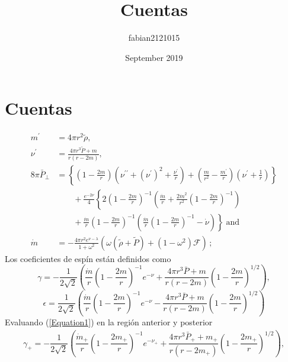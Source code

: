\documentclass{article}
\title{Cuentas}
\author{fabian2121015 }
\date{September 2019}
\begin{document}
\maketitle

\section{Cuentas}
\begin{align}
m^{\prime } &= 4 \pi r^{2}\tilde{\rho}, \label{EinsEq300}  \\
\nu^{\prime} & = \frac{4\pi r^{3}\tilde{P}+ m}{r(r-2m)}, \label{EinsEq311} \\
8\pi \bar{P}_{\perp} &= \left\{ \left( 1-\frac{2m}{r} \right) \left( \nu^{\prime \prime} + (\nu^{\prime})^{2}+ \frac{\nu^{\prime}}{r}  \right) + \left(  \frac{m}{r^{2}} -\frac{m^{\prime }}{r}  \right) \left( \nu^{\prime} + \frac{1}{r}     \right)   \right\} 
\nonumber \\ 
& \qquad  + \frac{e^{-2\nu}}{4} \left\{ 2\left(1 - \frac{2m}{r} \right)^{-1}
\left( \frac{\ddot{m}}{r} +\frac{2\dot{m}^2}{r^2} \left(1 - \frac{2m}{r} \right)^{-1}
\right)\right. \nonumber \\
& \qquad + \left.
\frac{\dot{m}}{r}\left(1 - \frac{2m}{r} \right)^{-1}
\left(\frac{\dot{m}}{r}\left(1 - \frac{2m}{r} \right)^{-1} -\dot{\nu}
\right)
\right\} \; \textrm{and} \label{EinsEq322} \\
\dot{m} &= -\frac{4 \pi r^{2} e^{\nu-\lambda}}{1+\omega^{2}}\left( \omega(\tilde{\rho}+ \tilde{P})+ (1-\omega^{2})\mathcal{F}     \right)  \label{EinsEq301}\, ;
\end{align}
Los coeficientes de espín están definidos como
\begin{equation}
\gamma = -\dfrac{1}{2\sqrt{2}}\left( \dfrac{\dot{m}}{r}\left( 1-\dfrac{2m}{r}\right)^{-1} e^{-\nu} + \dfrac{4\pi r^{3}\bar{P}+m}{r \left( r-2m \right)}\left(1-\dfrac{2m}{r} \right)^{1/2}\right),
\label{Equation1}
\end{equation}
\begin{equation}
    \epsilon = \dfrac{1}{2\sqrt{2}}\left( \dfrac{\dot{m}}{r}\left( 1-\dfrac{2m}{r}\right)^{-1} e^{-\nu} - \dfrac{4\pi r^{3}\bar{P}+m}{r \left( r-2m \right)}\left(1-\dfrac{2m}{r} \right)^{1/2}\right)
\end{equation}
Evaluando (\ref{Equation1}) en la región anterior y posterior
\begin{align}
    \gamma_{+} = -\dfrac{1}{2\sqrt{2}}\left( \dfrac{\dot{m}_{+}}{r}\left( 1-\dfrac{2m_{+}}{r}\right)^{-1} e^{-\nu_{+}} + \dfrac{4\pi r^{3}\bar{P}_{+}+m_{+}}{r \left( r-2m_{+} \right)}\left(1-\dfrac{2m_{+}}{r} \right)^{1/2}\right),
    \label{Equation 3}
\end{align}
\end{document}
